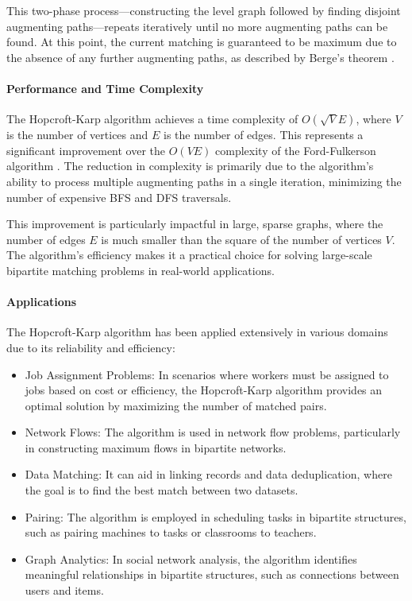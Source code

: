 This two-phase process—constructing the level graph followed by finding disjoint augmenting paths—repeats iteratively until no more augmenting paths can be found. At this point, the current matching is guaranteed to be maximum due to the absence of any further augmenting paths, as described by Berge's theorem \cite{berge1957two}.

\paragraph{Performance and Time Complexity}
The Hopcroft-Karp algorithm achieves a time complexity of \(O(\sqrt{V}E)\), where \(V\) is the number of vertices and \(E\) is the number of edges. This represents a significant improvement over the \(O(VE)\) complexity of the Ford-Fulkerson algorithm \cite{ford1956flows}. The reduction in complexity is primarily due to the algorithm's ability to process multiple augmenting paths in a single iteration, minimizing the number of expensive BFS and DFS traversals.

This improvement is particularly impactful in large, sparse graphs, where the number of edges \(E\) is much smaller than the square of the number of vertices \(V\). The algorithm’s efficiency makes it a practical choice for solving large-scale bipartite matching problems in real-world applications.

\paragraph{Applications}
The Hopcroft-Karp algorithm has been applied extensively in various domains due to its reliability and efficiency:
\begin{itemize}
    \item Job Assignment Problems:
    In scenarios where workers must be assigned to jobs based on cost or efficiency, the Hopcroft-Karp algorithm provides an optimal solution by maximizing the number of matched pairs.
    
    \item Network Flows:
    The algorithm is used in network flow problems, particularly in constructing maximum flows in bipartite networks.
    
    \item Data Matching:
    It can aid in linking records and data deduplication, where the goal is to find the best match between two datasets.
    
    \item Pairing:
    The algorithm is employed in scheduling tasks in bipartite structures, such as pairing machines to tasks or classrooms to teachers.
    
    \item Graph Analytics:
    In social network analysis, the algorithm identifies meaningful relationships in bipartite structures, such as connections between users and items.
\end{itemize}

